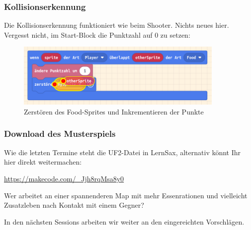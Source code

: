 \documentclass{beamer}
\begin{document}
\begin{frame}
 \frametitle{Kollisionserkennung}
 
Die Kollisionserkennung funktioniert wie beim Shooter. Nichts neues hier. Vergesst nicht, im Start-Block die Punktzahl auf 0 zu setzen:
 
\begin{figure}
  \includegraphics[width=10cm]{game49.png}
  \caption{Zerstören des Food-Sprites und Inkrementieren der Punkte}
  \label{fig:game49}
\end{figure}
\end{frame}
 

\begin{frame}
 \frametitle{Download des Musterspiels}

Wie die letzten Termine steht die UF2-Datei in LernSax, alternativ könnt Ihr hier direkt weitermachen:

\href{https://makecode.com/\_Jjh8rqMsa8y0}{https://makecode.com/\_Jjh8rqMsa8y0} 

Wer arbeitet an einer spannenderen Map mit mehr Essenrationen und vielleicht Zusatzleben nach Kontakt mit einem Gegner?

In den nächsten Sessions arbeiten wir weiter an den eingereichten Vorschlägen.
\end{frame}
\end{document}
